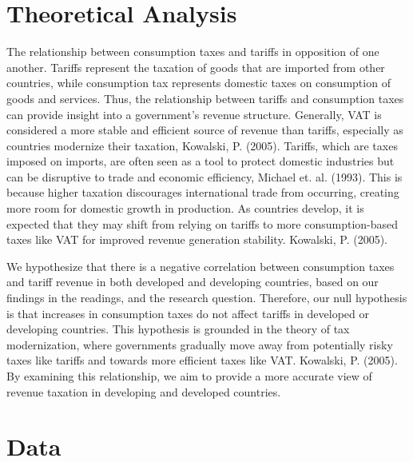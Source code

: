 \documentclass[12pt]{article}
\begin{document}
\section{Theoretical Analysis}
\label{sec:theory}
The relationship between consumption taxes and tariffs in opposition of one another. Tariffs represent the taxation of goods that are imported from other countries, while consumption tax represents domestic taxes on consumption of goods and services. Thus, the relationship between tariffs and consumption taxes can provide insight into a government's revenue structure. Generally, VAT is considered a more stable and efficient source of revenue than tariffs, especially as countries modernize their taxation, Kowalski, P. (2005). Tariffs, which are taxes imposed on imports, are often seen as a tool to protect domestic industries but can be disruptive to trade and economic efficiency, Michael et. al. (1993). This is because higher taxation discourages international trade from occurring, creating more room for domestic growth in production. As countries develop, it is expected that they may shift from relying on tariffs to more consumption-based taxes like VAT for improved revenue generation stability. Kowalski, P. (2005).

We hypothesize that there is a negative correlation between consumption taxes and tariff revenue in both developed and developing countries, based on our findings in the readings, and the research question. Therefore, our null hypothesis is that increases in consumption taxes do not affect tariffs in developed or developing countries. This hypothesis is grounded in the theory of tax modernization, where governments gradually move away from potentially risky taxes like tariffs and towards more efficient taxes like VAT. Kowalski, P. (2005). By examining this relationship, we aim to provide a more accurate view of revenue taxation in developing and developed countries.

\section{Data}
\label{sec:data}
\end{document}
